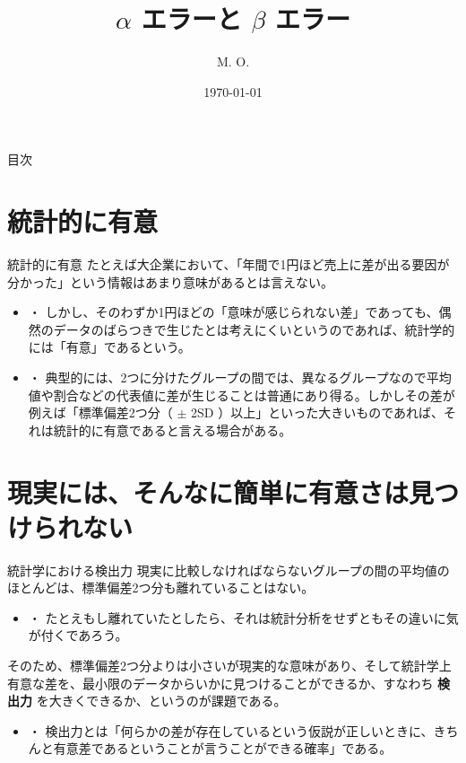\documentclass[dvipdfmx, autodetect-engine, aspectratio=169, 10.5pt]{beamer}
\title{$\alpha$ エラーと $\beta$ エラー}
\author{M. O.}
\date{\today}
\begin{document}
\begin{frame}[plain]
	\titlepage
\end{frame}

\begin{frame}{目次}
	\tableofcontents
\end{frame}

\section{統計的に有意}

\begin{frame}{統計的に有意}
	たとえば大企業において、「年間で1円ほど売上に差が出る要因が分かった」という情報はあまり意味があるとは言えない。
	\begin{itemize}
		\item ・ しかし、そのわずか1円ほどの「意味が感じられない差」であっても、偶然のデータのばらつきで生じたとは考えにくいというのであれば、統計学的には「有意」であるという。
		\item ・ 典型的には、2つに分けたグループの間では、異なるグループなので平均値や割合などの代表値に差が生じることは普通にあり得る。しかしその差が例えば「標準偏差2つ分（ $\pm$ 2SD ）以上」といった大きいものであれば、それは統計的に有意であると言える場合がある。
	\end{itemize}
\end{frame}

\section{現実には、そんなに簡単に有意さは見つけられない}

\begin{frame}{統計学における検出力}
	現実に比較しなければならないグループの間の平均値のほとんどは、標準偏差2つ分も離れていることはない。
	\begin{itemize}
		\item ・ たとえもし離れていたとしたら、それは統計分析をせずともその違いに気が付くであろう。
	\end{itemize}
	そのため、標準偏差2つ分よりは小さいが現実的な意味があり、そして統計学上有意な差を、最小限のデータからいかに見つけることができるか、すなわち \textbf{検出力} を大きくできるか、というのが課題である。
	\begin{itemize}
		\item ・ 検出力とは「何らかの差が存在しているという仮説が正しいときに、きちんと有意差であるということが言うことができる確率」である。
	\end{itemize}
\end{frame}
\end{document}
